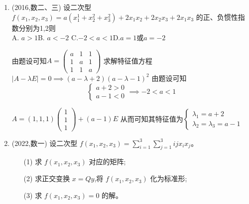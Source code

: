 \documentclass[12pt, a4paper, oneside, UTF8]{ctexbook}
\begin{document}
\begin{enumerate}[label=\arabic*.]
    \item (2016,数二、三) 设二次型 $ f(x_1, x_2, x_3) = a(x^1_1+x^2_2+x_3^2)+
    2x_1x_2+2x_2x_3+2x_1x_3$ 的正、负惯性指数分别为1,2则 \\
    A. $a > 1$\qquad B. $a < -2$ \qquad C.$-2<a<1$\qquad D.$a=1$或$a=-2$ 
    
    \begin{solution}[直接求特征值]
    由题设可知$A=\begin{pmatrix}
        a & 1 & 1 \\
        1 & a & 1 \\
        1 & 1 & a 
    \end{pmatrix}$
    求解特征值方程$\left|A-\lambda E\right|=0\implies (a-\lambda+2)(a-\lambda-1)^2$ 由题设可知 
    $$
    \begin{cases}
        a+2 > 0 \\
        a-1 < 0 
    \end{cases} \implies -2 < a < 1
    $$
    \end{solution}
    
    \begin{solution}[分解为秩1矩阵]
        $A=(1,1,1)\begin{pmatrix}
            1 \\
            1 \\
            1
        \end{pmatrix}+(a-1)E$ 从而可知其特征值为$\begin{cases}
            \lambda_1 = a + 2 \\
            \lambda_2=\lambda_3 = a - 1
        \end{cases}$
    \end{solution}
    \item (2022,数一) 设二次型 $ f(x_1, x_2, x_3) = 
    \displaystyle \sum_{i=1}^3 \sum_{j=1}^3 i j x_i x_j $。
    \begin{enumerate}
        \item [(1)] 求 $ f(x_1, x_2, x_3) $ 对应的矩阵;
        \item [(2)] 求正交变换 $ x = Q y $,将 $ f(x_1, x_2, x_3) $ 化为标准形;
        \item [(3)] 求 $ f(x_1, x_2, x_3) = 0 $ 的解。
    \end{enumerate}
    

\end{enumerate}
\end{document}
